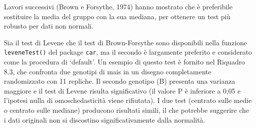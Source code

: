 \documentclass[
  12pt,
]{book}
\begin{document}
Lavori successivi (Brown e Forsythe, 1974) hanno mostrato che è preferibile sostituire la media del gruppo con la sua mediana, per ottenere un test più robusto per dati non normali.

Sia il test di Levene che il test di Brown-Forsythe sono disponibili nella funzione \texttt{leveneTest()} del package \texttt{car}, ma il secondo è largamente preferito e considerato come la procedura di `default'. Un esempio di questo test è fornito nel Riquadro 8.3, che confronta due genotipi di mais in un disegno completamente randomizzato con 11 repliche. Il secondo genotipo (B) presenta una varianza maggiore e il test di Levene risulta significativo (il valore P è inferiore a 0,05 e l'ipotesi nulla di omoschedasticità viene rifiutata). I due test (centrato sulle medie o centrato sulle mediane) producono risultati simili, il che potrebbe suggerire che i dati originali non si discostino significativamente dalla normalità.
\end{document}
